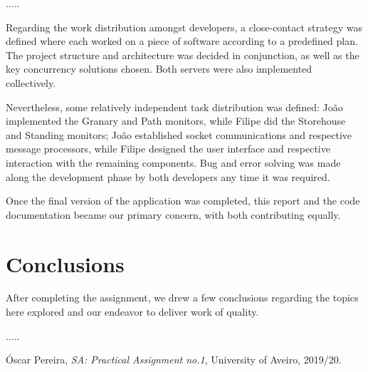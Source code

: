 \documentclass[12pt]{article}
\begin{document}
.....

Regarding the work distribution amongst developers, a close-contact strategy was defined where each worked on a piece of software according to a predefined plan. 
The project structure and architecture was decided in conjunction, as well as the key concurrency solutions chosen.
Both servers were also implemented collectively.

Nevertheless, some relatively independent task distribution was defined: João implemented the Granary and Path monitors, while Filipe did the Storehouse and 
Standing monitors; João established socket communications and respective message processors, while Filipe designed the user interface and respective interaction
with the remaining components.
Bug and error solving was made along the development phase by both developers any time it was required.

Once the final version of the application was completed, this report and the code documentation became our primary concern, with both contributing equally.


\newpage
\section{Conclusions} %

After completing the assignment, we drew a few conclusions regarding the topics here explored and our endeavor to deliver work of quality.

.....

\begin{thebibliography}{9} %
  

    Óscar Pereira,
    \textit{SA: Practical Assignment no.1},
    University of Aveiro,
    2019/20.
  

  
\end{thebibliography}

\clearpage
\end{document}
